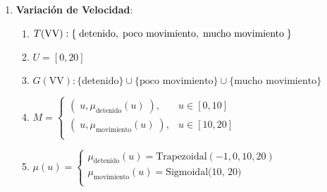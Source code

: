 \documentclass[a4paper,10pt,twocolumn]{article}
\begin{document}
\begin{enumerate}
	\item[] \textbf{Variaci\'on de Velocidad}:
		\begin{enumerate}
			\item[] $T(\text{VV}): \{ \;\text{detenido}, \;\text{poco movimiento}, \\\;\text{mucho movimiento}\; \}$
			\item[] $U = [0, 20]$
			\item[] $G(\text{VV}): \{\text{detenido}\} \cup \{\text{poco movimiento}\} \cup \{\text{mucho movimiento}\}$ 
			\item[] $M = \begin{cases}
			(\;u, \mu_{\text{detenido}} (u) \;), & u \in [0, 10] \\
			(\;u, \mu_{\text{movimiento}} (u) \;), & u \in [10, 20] \\
			\end{cases}$
			\item[] $\mu(u) = \begin{cases}
			\mu_{\text{detenido}} (u) = \text{Trapezoidal}(-1, 0, 10, 20) \\
			\mu_{\text{movimiento}} (u) = \text{Sigmoidal(10, 20)} \\
			\end{cases}$
		\end{enumerate}
	

\end{enumerate}
\end{document}
